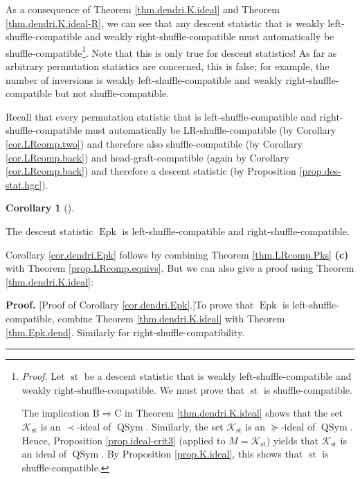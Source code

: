 \documentclass[numbers=enddot,12pt,final,onecolumn,notitlepage]{scrartcl}%
\theoremstyle{definition}
\newtheorem{coro}[theo]{Corollary}
\newenvironment{corollary}[1][]
{\begin{coro}[#1]\begin{leftbar}}
{\end{leftbar}\end{coro}}
\newenvironment{proof}[1][Proof]{\noindent\textbf{#1.} }{\ \rule{0.5em}{0.5em}}
\newenvironment{verlong}{}{}
\begin{document}
\begin{verlong}
As a consequence of Theorem \ref{thm.dendri.K.ideal} and Theorem
\ref{thm.dendri.K.ideal-R}, we can see that any descent statistic that is
weakly left-shuffle-compatible and weakly right-shuffle-compatible must
automatically be shuffle-compatible\footnote{\textit{Proof.} Let
$\operatorname*{st}$ be a descent statistic that is weakly
left-shuffle-compatible and weakly right-shuffle-compatible. We must prove
that $\operatorname*{st}$ is shuffle-compatible.
\par
The implication B$\Longrightarrow$C in Theorem \ref{thm.dendri.K.ideal} shows
that the set $\mathcal{K}_{\operatorname*{st}}$ is an $\left.  \prec\right.
$-ideal of $\operatorname*{QSym}$. Similarly, the set $\mathcal{K}%
_{\operatorname*{st}}$ is an $\left.  \succeq\right.  $-ideal of
$\operatorname*{QSym}$. Hence, Proposition \ref{prop.ideal-crit3} (applied to
$M=\mathcal{K}_{\operatorname*{st}}$) yields that $\mathcal{K}%
_{\operatorname*{st}}$ is an ideal of $\operatorname*{QSym}$. By Proposition
\ref{prop.K.ideal}, this shows that $\operatorname*{st}$ is
shuffle-compatible.}. Note that this is only true for descent statistics! As
far as arbitrary permutation statistics are concerned, this is false; for
example, the number of inversions is weakly left-shuffle-compatible and weakly
right-shuffle-compatible but not shuffle-compatible.

Recall that every permutation statistic that is left-shuffle-compatible and
right-shuffle-compatible must automatically be LR-shuffle-compatible (by
Corollary \ref{cor.LRcomp.two}) and therefore also shuffle-compatible (by
Corollary \ref{cor.LRcomp.back}) and head-graft-compatible (again by Corollary
\ref{cor.LRcomp.back}) and therefore a descent statistic (by Proposition
\ref{prop.des-stat.hgc}).

\begin{corollary}
\label{cor.dendri.Epk}The descent statistic $\operatorname*{Epk}$ is
left-shuffle-compatible and right-shuffle-compatible.
\end{corollary}

Corollary \ref{cor.dendri.Epk} follows by combining Theorem
\ref{thm.LRcomp.Pks} \textbf{(c)} with Theorem \ref{prop.LRcomp.equivs}. But
we can also give a proof using Theorem \ref{thm.dendri.K.ideal}:

\begin{proof}
[Proof of Corollary \ref{cor.dendri.Epk}.]To prove that $\operatorname*{Epk}$
is left-shuffle-compatible, combine Theorem \ref{thm.dendri.K.ideal} with
Theorem \ref{thm.Epk.dend}. Similarly for right-shuffle-compatibility.
\end{proof}


\end{verlong}
\end{document}
